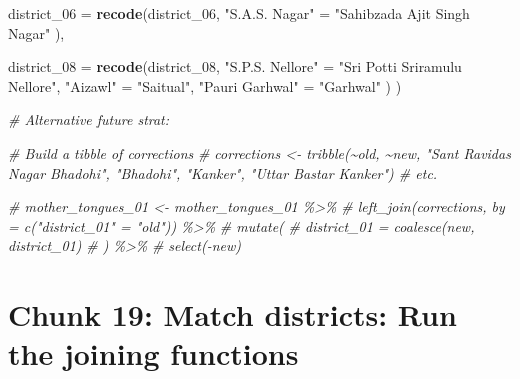 \documentclass[
]{article}
\newenvironment{Shaded}{\begin{snugshade}}{\end{snugshade}}
\newcommand{\AttributeTok}[1]{\textcolor[rgb]{0.13,0.29,0.53}{#1}}
\newcommand{\CommentTok}[1]{\textcolor[rgb]{0.56,0.35,0.01}{\textit{#1}}}
\newcommand{\FunctionTok}[1]{\textcolor[rgb]{0.13,0.29,0.53}{\textbf{#1}}}
\newcommand{\NormalTok}[1]{#1}
\newcommand{\OtherTok}[1]{\textcolor[rgb]{0.56,0.35,0.01}{#1}}
\newcommand{\StringTok}[1]{\textcolor[rgb]{0.31,0.60,0.02}{#1}}
\begin{document}
\begin{Shaded}
\begin{Highlighting}[]
    \AttributeTok{district\_06 =} \FunctionTok{recode}\NormalTok{(district\_06,}
      \StringTok{"S.A.S. Nagar"} \OtherTok{=} \StringTok{"Sahibzada Ajit Singh Nagar"}
\NormalTok{    ),}
    
    \AttributeTok{district\_08 =} \FunctionTok{recode}\NormalTok{(district\_08,}
      \StringTok{"S.P.S. Nellore"} \OtherTok{=} \StringTok{"Sri Potti Sriramulu Nellore"}\NormalTok{,}
      \StringTok{"Aizawl"} \OtherTok{=} \StringTok{"Saitual"}\NormalTok{,}
      \StringTok{"Pauri Garhwal"} \OtherTok{=} \StringTok{"Garhwal"}
\NormalTok{    )}
\NormalTok{  )}



\CommentTok{\# Alternative future strat: }

\CommentTok{\# Build a tibble of corrections}
\CommentTok{\# corrections \textless{}{-} tribble(\textasciitilde{}old, \textasciitilde{}new, "Sant Ravidas Nagar Bhadohi", "Bhadohi", "Kanker", "Uttar Bastar Kanker") \# etc.}

\CommentTok{\# mother\_tongues\_01 \textless{}{-} mother\_tongues\_01 \%\textgreater{}\%}
\CommentTok{\#   left\_join(corrections, by = c("district\_01" = "old")) \%\textgreater{}\%}
\CommentTok{\#   mutate(}
\CommentTok{\#     district\_01 = coalesce(new, district\_01)}
\CommentTok{\#   ) \%\textgreater{}\%}
\CommentTok{\#   select({-}new)}
\end{Highlighting}
\end{Shaded}

\section*{Chunk 19: Match districts: Run the joining functions}\label{chunk-19-match-districts-run-the-joining-functions}
\end{document}
